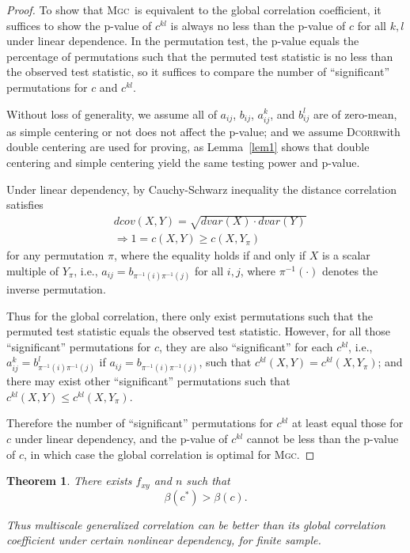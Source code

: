 \documentclass[11pt]{article}
\providecommand{\sct}[1]{{\normalfont\textsc{#1}}}
\newcommand{\G}{c}
\newcommand{\Mgc}{\sct{Mgc}}
\newcommand{\Dcorr}{\sct{Dcorr}}
\newtheorem{appThm}{Theorem}
\begin{document}
\begin{proof}
To show that \Mgc~is equivalent to the global correlation coefficient, it suffices to show the p-value of $\G^{kl}$ is always no less than the p-value of $\G$ for all $k,l$ under linear dependence. In the permutation test, the p-value equals the percentage of permutations such that the permuted test statistic is no less than the observed test statistic, so it suffices to compare the number of ``significant'' permutations for $\G$ and $\G^{kl}$.

Without loss of generality, we assume all of $a_{ij}$, $b_{ij}$, $a_{ij}^{k}$, and $b_{ij}^{l}$ are of zero-mean, as simple centering or not does not affect the p-value; and we assume \Dcorr with double centering are used for proving, as Lemma~\ref{lem1} shows that double centering and simple centering yield the same testing power and p-value.

Under linear dependency, by Cauchy-Schwarz inequality the distance correlation satisfies
\begin{align*}
& dcov(X,Y) = \sqrt{dvar(X) \cdot dvar(Y)} \\
& \Rightarrow 1=\G(X, Y) \geq \G(X, Y_{\pi})
\end{align*}
for any permutation $\pi$, where the equality holds if and only if $X$ is a scalar multiple of $Y_{\pi}$, i.e., $a_{ij}=b_{\pi^{-1}(i) \pi^{-1}(j)}$ for all $i,j$, where $\pi^{-1}(\cdot)$ denotes the inverse permutation. %

Thus for the global correlation, there only exist permutations such that the permuted test statistic equals the observed test statistic. However, for all those ``significant'' permutations for $\G$, they are also ``significant'' for each $\G^{kl}$, i.e., $a_{ij}^{k}=b_{\pi^{-1}(i) \pi^{-1}(j)}^{l}$ if $a_{ij}=b_{\pi^{-1}(i) \pi^{-1}(j)}$, such that $\G^{kl}(X, Y)=\G^{kl}(X, Y_{\pi})$; and there may exist other ``significant'' permutations such that $\G^{kl}(X, Y) \leq \G^{kl}(X, Y_{\pi})$.

Therefore the number of ``significant'' permutations for $\G^{kl}$ at least equal those for $\G$ under linear dependency, and the p-value of $\G^{kl}$ cannot be less than the p-value of $\G$, in which case the global correlation is optimal for \Mgc. 
\end{proof}


\begin{appThm}
There exists $f_{xy}$ and $n$ such that
\begin{equation*}
\beta(\G^{*}) > \beta(\G).
\end{equation*}

Thus multiscale generalized correlation can be better than its global correlation coefficient under certain nonlinear dependency, for finite sample.
\end{appThm}
\end{document}
